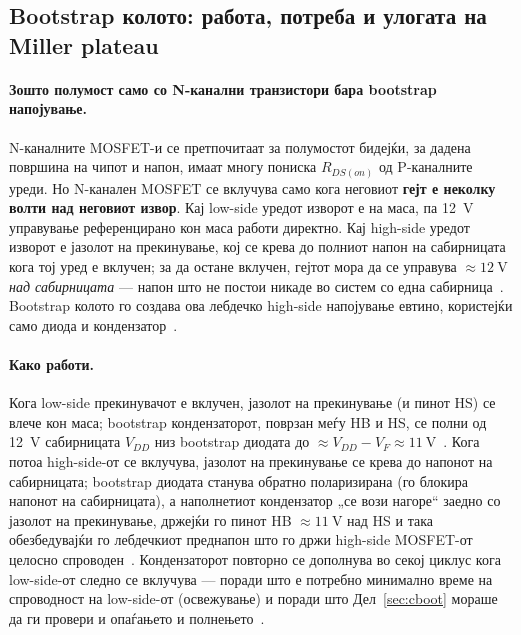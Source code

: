\documentclass[journal,onecolumn,11pt]{IEEEtran}
\begin{document}
\subsection{Bootstrap колото: работа, потреба и улогата на Miller plateau}
\label{sec:boottheory}
\paragraph{Зошто полумост само со N-канални транзистори бара bootstrap напојување.}
N-каналните MOSFET-и се претпочитаат за полумостот бидејќи, за дадена површина на
чипот и напон, имаат многу пониска $R_{DS(on)}$ од P-каналните уреди. Но N-канален
MOSFET се вклучува само кога неговиот \textbf{гејт е неколку волти над неговиот
извор}. Кај low-side уредот изворот е на маса, па \SI{12}{\volt} управување
референцирано кон маса работи директно. Кај high-side уредот изворот е јазолот на
прекинување, кој се крева до полниот напон на сабирницата кога тој уред е вклучен;
за да остане вклучен, гејтот мора да се управува $\approx\SI{12}{\volt}$
\emph{над сабирницата} --- напон што не постои никаде во систем со една
сабирница~\cite{ucc27211,balogh}. Bootstrap колото го создава ова лебдечко
high-side напојување евтино, користејќи само диода и кондензатор~\cite{infineon_monolithic}.

\paragraph{Како работи.} Кога low-side прекинувачот е вклучен, јазолот на
прекинување (и пинот HS) се влече кон маса; bootstrap кондензаторот, поврзан меѓу HB
и HS, се полни од \SI{12}{\volt} сабирницата $V_{DD}$ низ bootstrap диодата до
$\approx V_{DD}-V_F\approx\SI{11}{\volt}$~\cite{ucc27211,infineon_monolithic}. Кога
потоа high-side-от се вклучува, јазолот на прекинување се крева до напонот на
сабирницата; bootstrap диодата станува обратно поларизирана (го блокира напонот на
сабирницата), а наполнетиот кондензатор „се вози нагоре“ заедно со јазолот на
прекинување, држејќи го пинот HB $\approx\SI{11}{\volt}$ над HS и така
обезбедувајќи го лебдечкиот преднапон што го држи high-side MOSFET-от целосно
спроводен~\cite{ucc27211,infineon_monolithic}. Кондензаторот повторно се дополнува
во секој циклус кога low-side-от следно се вклучува --- поради што е потребно
минимално време на спроводност на low-side-от (освежување) и поради што
Дел~\ref{sec:cboot} мораше да ги провери и опаѓањето и полнењето~\cite{infineon_monolithic,infineon_bootoverview}.
\end{document}
